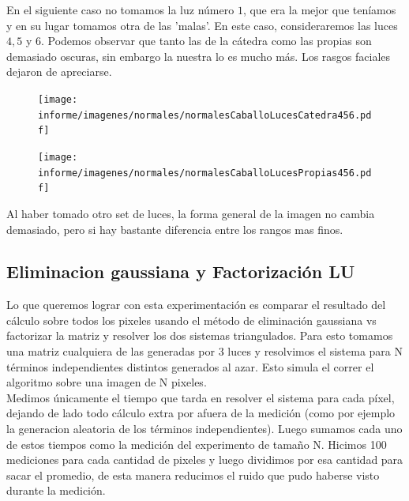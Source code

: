En el siguiente caso no tomamos la luz número $1$, que era la mejor que teníamos y en su lugar tomamos otra de las 'malas'. En este caso, consideraremos las luces $4, 5$ y $6$. Podemos observar que tanto las de la cátedra como las propias son demasiado oscuras, sin embargo la nuestra lo es mucho más. Los rasgos faciales dejaron de apreciarse. \\

\begin{figure}[H]
\centering
\begin{minipage}{.5\textwidth}
    \centering
        \texttt{[image: informe/imagenes/normales/normalesCaballoLucesCatedra456.pdf]}
\end{minipage}%
\begin{minipage}{.5\textwidth}
    \centering
        \texttt{[image: informe/imagenes/normales/normalesCaballoLucesPropias456.pdf]} \\
\end{minipage}
\end{figure}

Al haber tomado otro set de luces, la forma general de la imagen no cambia demasiado, pero si hay bastante diferencia entre los rangos mas finos.

\subsection{Eliminacion gaussiana y Factorización LU}

Lo que queremos lograr con esta experimentación es comparar el resultado del cálculo sobre todos los pixeles usando el método de eliminación gaussiana vs factorizar la matriz y resolver los dos sistemas triangulados.
Para esto tomamos una matriz cualquiera de las generadas por 3 luces y resolvimos el sistema para N términos independientes distintos generados al azar. Esto simula el correr el algoritmo sobre una imagen de N pixeles.\\

Medimos únicamente el tiempo que tarda en resolver el sistema para cada píxel, dejando de lado todo cálculo extra por afuera de la medición (como por ejemplo la generacion aleatoria de los términos independientes). Luego sumamos cada uno de estos tiempos como la medición del experimento de tamaño N.
Hicimos 100 mediciones para cada cantidad de pixeles y luego dividimos por esa cantidad para sacar el promedio, de esta manera reducimos el ruido que pudo haberse visto durante la medición.

